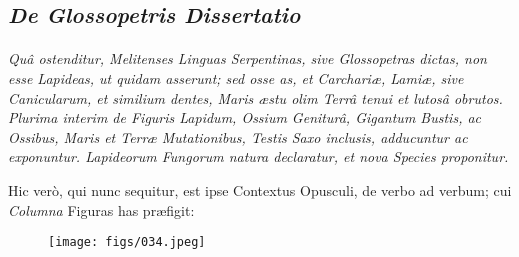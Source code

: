 \documentclass[a4paper, 11pt, oneside, polutonikogreek, german]{article}
\begin{document}
\subsection{\emph{De Glossopetris Dissertatio}}
\paragraph{}
\emph{Quâ ostenditur, Melitenses Linguas Serpentinas, sive Glossopetras dictas, non esse Lapideas, ut quidam asserunt; sed osse
as, et Carchariæ, Lamiæ, sive Canicularum, et similium dentes, Maris æstu olim Terrâ tenui et lutosâ obrutos. Plurima interim de Figuris Lapidum, Ossium Geniturâ, Gigantum Bustis, ac Ossibus, Maris et Terræ Mutationibus, Testis Saxo inclusis, adducuntur ac exponuntur. Lapideorum Fungorum natura declaratur, et nova Species proponitur.}

Hic verò, qui nunc sequitur, est ipse Contextus Opusculi, de verbo ad verbum; cui \emph{Columna} Figuras has præfigit:

\begin{figure}[H]
\centering
\texttt{[image: figs/034.jpeg]}
\end{figure}
\end{document}
